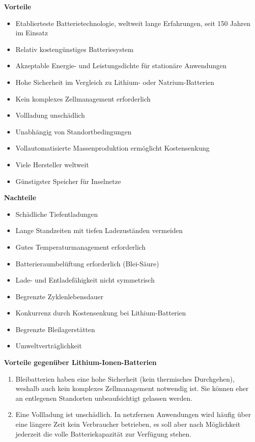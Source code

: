 \begin{minipage}[t]{0.48\textwidth}
\textbf{Vorteile}
\begin{itemize}
  \item Etablierteste Batterietechnologie, weltweit lange Erfahrungen, seit 150 Jahren im Einsatz
  \item Relativ kostengünstiges Batteriesystem
  \item Akzeptable Energie- und Leistungsdichte für stationäre Anwendungen
  \item Hohe Sicherheit im Vergleich zu Lithium- oder Natrium-Batterien
  \item Kein komplexes Zellmanagement erforderlich
  \item Vollladung unschädlich
  \item Unabhängig von Standortbedingungen
  \item Vollautomatisierte Massenproduktion ermöglicht Kostensenkung
  \item Viele Hersteller weltweit
  \item Günstigster Speicher für Inselnetze
\end{itemize}
\end{minipage}
\hfill
\begin{minipage}[t]{0.48\textwidth}
\textbf{Nachteile}
\begin{itemize}
  \item Schädliche Tiefentladungen
  \item Lange Standzeiten mit tiefen Ladezuständen vermeiden
  \item Gutes Temperaturmanagement erforderlich
  \item Batterieraumbelüftung erforderlich (Blei-Säure)
  \item Lade- und Entladefähigkeit nicht symmetrisch
  \item Begrenzte Zyklenlebensdauer
  \item Konkurrenz durch Kostensenkung bei Lithium-Batterien
  \item Begrenzte Bleilagerstätten
  \item Umweltverträglichkeit
\end{itemize}
\end{minipage}

\vspace{0.1cm}

\textbf{Vorteile gegenüber Lithium-Ionen-Batterien}

\begin{enumerate}
    \item Bleibatterien haben eine hohe Sicherheit (kein thermisches Durchgehen), weshalb auch kein komplexes Zellmanagement notwendig ist. Sie können eher an entlegenen Standorten unbeaufsichtigt gelassen werden.
    \item Eine Vollladung ist unschädlich. In netzfernen Anwendungen wird häufig über eine längere Zeit kein Verbraucher betrieben, es soll aber nach Möglichkeit jederzeit die volle Batteriekapazität zur Verfügung stehen.
\end{enumerate}



